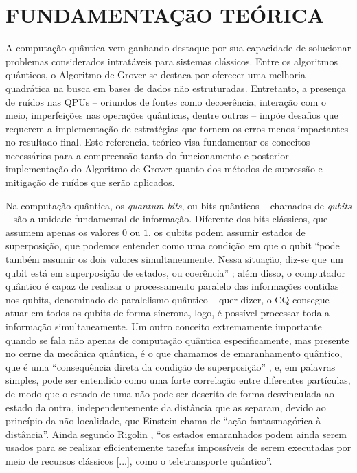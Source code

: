 \chapter{FUNDAMENTAÇ\~{a}O TEÓRICA}
\label{chap:fundamentacao}

A computaç\~{a}o qu\^{a}ntica vem ganhando destaque por sua capacidade de solucionar problemas considerados intrat\'{a}veis para sistemas cl\'{a}ssicos. Entre os algoritmos qu\^{a}nticos, o Algoritmo de Grover se destaca por oferecer uma melhoria quadr\'{a}tica na busca em bases de dados n\~{a}o estruturadas. Entretanto, a presença de ruídos nas QPUs – oriundos de fontes como decoer\^{e}ncia, interaç\~{a}o com o meio, imperfeições nas operações qu\^{a}nticas, dentre outras – impõe desafios que requerem a implementaç\~{a}o de estrat\'{e}gias que tornem os erros menos impactantes no resultado final. Este referencial teórico visa fundamentar os conceitos necess\'{a}rios para a compreens\~{a}o tanto do funcionamento e posterior implementaç\~{a}o do Algoritmo de Grover quanto dos m\'{e}todos de supress\~{a}o e mitigaç\~{a}o de ruídos que ser\~{a}o aplicados.

Na computaç\~{a}o qu\^{a}ntica, os \textit{quantum bits}, ou bits qu\^{a}nticos – chamados de \textit{qubits} – s\~{a}o a unidade fundamental de informaç\~{a}o. Diferente dos bits cl\'{a}ssicos, que assumem apenas os valores $0$ ou $1$, os qubits podem assumir estados de superposiç\~{a}o, que podemos entender como uma condiç\~{a}o em que o qubit “pode tamb\'{e}m assumir os dois valores simultaneamente. Nessa situaç\~{a}o, diz-se que  um  qubit  est\'{a}  em  superposiç\~{a}o  de  estados,  ou  coer\^{e}ncia” \cite{Cuzziol2023_Superposicao}; al\'{e}m disso, o computador qu\^{a}ntico \'{e} capaz de realizar o processamento paralelo das informações contidas nos qubits, denominado de paralelismo qu\^{a}ntico – quer dizer, o CQ consegue atuar em todos os qubits de forma síncrona, logo, \'{e} possível processar toda a informaç\~{a}o simultaneamente. Um outro conceito extremamente importante quando se fala n\~{a}o apenas de computaç\~{a}o qu\^{a}ntica especificamente, mas presente no cerne da mec\^{a}nica qu\^{a}ntica, \'{e} o que chamamos de emaranhamento qu\^{a}ntico, que \'{e} uma “consequ\^{e}ncia direta da condiç\~{a}o de superposiç\~{a}o” \cite{Rigolin2008_Emaranhamento}, e, em palavras simples, pode ser entendido como uma forte correlaç\~{a}o entre diferentes partículas, de modo que o estado de uma n\~{a}o pode ser descrito de forma desvinculada ao estado da outra, independentemente da dist\^{a}ncia que as separam, devido ao princípio da n\~{a}o localidade, que Einstein chama de “aç\~{a}o fantasmagórica à dist\^{a}ncia”. Ainda segundo Rigolin \citeyear{Rigolin2008_Emaranhamento}, “os estados emaranhados podem ainda serem usados para se realizar eficientemente tarefas impossíveis de serem executadas por meio de recursos cl\'{a}ssicos [...], como o teletransporte qu\^{a}ntico”.

